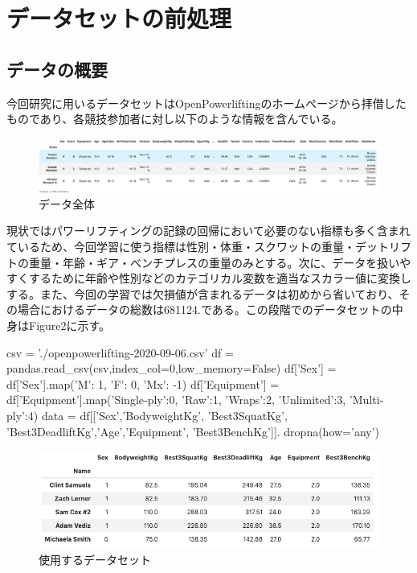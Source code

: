 \documentclass{article}
\begin{document}
\newpage
\section{データセットの前処理}


\subsection{データの概要}

今回研究に用いるデータセットはOpenPowerliftingのホームページから拝借したものであり、各競技参加者に対し以下のような情報を含んでいる。

\begin{figure}[H]
\begin{center}
\includegraphics[width=\linewidth]{data_head.png}
\caption{データ全体}
\end{center}
\end{figure}

現状ではパワーリフティングの記録の回帰において必要のない指標も多く含まれているため、今回学習に使う指標は性別・体重・スクワットの重量・デットリフトの重量・年齢・ギア・ベンチプレスの重量のみとする。次に、データを扱いやすくするために年齢や性別などのカテゴリカル変数を適当なスカラー値に変換しする。また、今回の学習では欠損値が含まれるデータは初めから省いており、その場合におけるデータの総数は681124.である。この段階でのデータセットの中身はFigure2に示す。
\\

\begin{python}[caption=必要なデータの選別]
csv = './openpowerlifting-2020-09-06.csv'
df = pandas.read_csv(csv,index_col=0,low_memory=False)
df['Sex'] = df['Sex'].map({'M': 1, 'F': 0, 'Mx': -1})
df['Equipment'] = df['Equipment'].map({'Single-ply':0, 
'Raw':1, 'Wraps':2, 'Unlimited':3, 'Multi-ply':4})
data = df[['Sex','BodyweightKg', 'Best3SquatKg', 
'Best3DeadliftKg','Age','Equipment', 'Best3BenchKg']].
dropna(how='any')
\end{python}


\begin{figure}[H]
\begin{center}
\includegraphics[width=\linewidth]{data_trimed.png}
\caption{使用するデータセット}
\end{center}
\end{figure}
\end{document}
